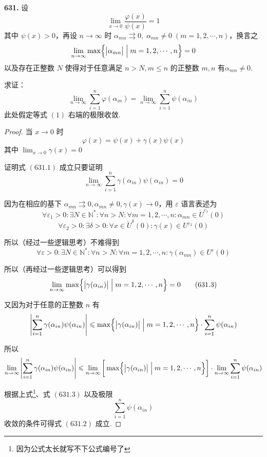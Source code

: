 \textbf{631.} 设
\[\lim_{x \rightarrow 0} \frac{\varphi(x)}{\psi(x)} = 1\]
其中 $\psi(x) > 0$，再设 $n \rightarrow \infty$ 时 $\alpha_{mn} \rightrightarrows 0,\; \alpha_{mn} \neq 0 \;(m = 1,2, \cdots, n)$，换言之
\[\lim_{n \rightarrow \infty} \max\Bigl\{ \bigl| \alpha_{mn}\bigr| \Bigm| m = 1,2,\cdots, n\Bigr\} = 0\]
以及存在正整数 $N$ 使得对于任意满足 $n > N, m \leqslant n$ 的正整数 $m,n$ 有$\alpha_{mn} \neq 0$.

求证：
\[\lim_{n \rightarrow \infty} \sum_{i=1}^{n} \varphi(\alpha_{in}) = \lim_{n \rightarrow \infty} \sum_{i=1}^{n} \psi(\alpha_{in}) \tag{631.1}\]
此处假定等式 $(1)$ 右端的极限收敛.

\begin{proof}
    当 $x \rightarrow 0$ 时
    \[\varphi(x) = \psi(x) + \gamma(x)\psi(x)\]
    其中 $\displaystyle \lim_{x \rightarrow 0} \gamma(x) = 0$

    证明式 $(631.1)$ 成立只要证明
    \[\lim_{n \rightarrow \infty} \sum_{i=1}^{n} \gamma(\alpha_{in})\psi(\alpha_{in}) = 0 \tag{631.2}\]

    因为在相应的基下 $\alpha_{mn} \rightrightarrows 0, \alpha_{mn} \neq 0, \gamma(x) \rightarrow 0$，用 $\varepsilon$ 语言表述为
    \[\forall \varepsilon_1 > 0: \exists N \in \mathbb{N}^*: \forall n > N: \forall m = 1,2,\cdots,n: \alpha_{mn} \in \mathring{U}^{\varepsilon_1}(0)\]
    \[\forall \varepsilon_2 > 0: \exists \delta > 0: \forall x \in \mathring{U}^\delta(0): \gamma(x) \in U^{\varepsilon_2}(0)\]

    所以（经过一些逻辑思考）不难得到
    \[\forall \varepsilon > 0: \exists N \in \mathbb{N}^*: \forall n > N: \forall m = 1,2,\cdots,n: \gamma(\alpha_{mn}) \in U^{\varepsilon}(0)\]

    所以（再经过一些逻辑思考）可以得到
    \[\lim_{n \rightarrow \infty} \max \Bigl\{ \bigl|\gamma(\alpha_{in})\bigr| \Bigm| m=1,2,\cdots,n \Bigr\} = 0 \tag{631.3}\]

    又因为对于任意的正整数 $n$ 有
    \[\left|\sum_{i=1}^{n} \gamma(\alpha_{in})\psi(\alpha_{in})\right| \leqslant \max \Bigl\{ \bigl|\gamma(\alpha_{in})\bigr| \Bigm| m=1,2,\cdots,n \Bigr\} \cdot \sum_{i=1}^{n} \psi(\alpha_{in})\]

    所以
    \[\lim_{n \rightarrow \infty} \left|\sum_{i=1}^{n} \gamma(\alpha_{in})\psi(\alpha_{in})\right| \leqslant \lim_{n \rightarrow \infty} \bigg[\max \Bigl\{ \bigl|\gamma(\alpha_{in})\bigr| \Bigm| m=1,2,\cdots,n \Bigr\}\bigg] \cdot \lim_{n \rightarrow \infty} \sum_{i=1}^{n} \psi(\alpha_{in})\]

    根据上式\footnote{因为公式太长就写不下公式编号了}、式 $(631.3)$ 以及极限
    \[\sum_{i=1}^{n} \psi(\alpha_{in})\]
    收敛的条件可得式 $(631.2)$ 成立.
\end{proof}\vspace{9pt}

